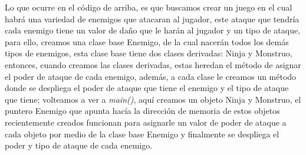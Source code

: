 Lo que ocurre en el código de arriba, es que buscamos crear un juego en el cual habrá una variedad de enemigos que atacaran al jugador, este ataque que tendría cada enemigo tiene un valor de daño que le harán al jugador y un tipo de ataque, para ello, creamos una clase base Enemigo, de la cual nacerán todos los demás tipos de enemigos, esta clase base tiene dos clases derivadas: Ninja y Monstruo, entonces, cuando creamos las clases derivadas, estas heredan el método de asignar el poder de ataque de cada enemigo, además, a cada clase le creamos un método donde se despliega el poder de ataque que tiene el enemigo y el tipo de ataque que tiene; volteamos a ver a \textit{main()}, aquí creamos un objeto Ninja y Monstruo, el puntero Enemigo que apunta hacía la dirección de memoria de estos objetos recientemente creados funcionan para asignarle un valor de poder de ataque a cada objeto por medio de la clase base Enemigo y finalmente se despliega el poder y tipo de ataque de cada enemigo.

